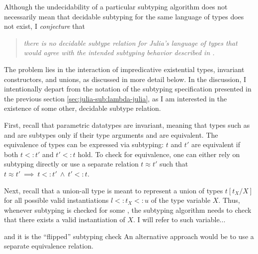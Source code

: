 Although the undecidability of a particular subtyping algorithm
does not necessarily mean that decidable subtyping for the same
language of types does not exist, I \emph{conjecture} that
\begin{quotation}\emph{
  there is no decidable subtype relation for Julia's language of types
  that would agree with the intended subtyping behavior
  described in .
}\end{quotation}
The problem lies in the interaction of
impredicative existential types, invariant constructors, and unions,
as discussed in more detail below.
In the discussion, I intentionally depart from the notation of the subtyping
specification presented in the previous section \ref{sec:julia-sub:lambda-julia},
as I am interested in the existence of some other, decidable subtype relation.

First, recall that parametric datatypes are invariant, meaning that
types such as  and  are subtypes
only if their type arguments  and  are equivalent.
The equivalence of types can be expressed via subtyping:
$t$ and $t'$ are equivalent
if both $t <: t'$ and $t' <: t$ hold.
To check for equivalence, one can either rely on subtyping directly
or use a separate relation $t \approx t'$ such that 
$t \approx t' \ \implies\ t <: t'\ \land\ t' <: t$.

Next, recall that a union-all type  is meant to represent
a union of types $t[t_X/X]$ for all possible valid instantiations
$l <: t_X <: u$ of the type variable $X$.
Thus, whenever subtyping is checked for some 
, the subtyping algorithm needs to check that
there exists a valid instantiation of $X$.
I will refer to such variable...

and it is the ``flipped'' subtyping check  
An alternative approach would be to use a separate equivalence relation.


